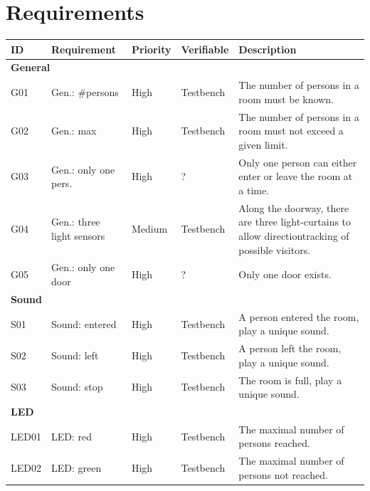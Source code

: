 \documentclass[12pt,a4 paper] {report}
\begin{document}
\newpage

\chapter{Requirements}
\begin{center}
	\begin{tabular}{|p{1.5cm}|p{3.5cm}|p{2cm}|p{2cm}|p{6cm}|}
		\hline
		\textbf{ID} & \textbf{Requirement} & \textbf{Priority} & \textbf{Verifiable} & \textbf{Description}\\
		\hline
		\multicolumn{5}{|l|}{\textbf{General}} \\
		\hline
		G01 & Gen.: \#persons &  High &  Testbench & The number of persons in a room must be known. \\
		\hline
		G02 & Gen.: max & High &  Testbench & The number of persons in a room must not exceed a given limit. \\
		\hline
		G03 & Gen.: only one pers. & High & ? & Only one person can either enter or leave the room at a time. \\
		\hline
		G04 & Gen.: three light sensors & Medium & Testbench & Along the doorway, there are three light-curtains to allow directiontracking of possible visitors. \\
		\hline
		G05 & Gen.: only one door & High & ? & Only one door exists. \\
		\hline
		\multicolumn{5}{|l|}{\textbf{Sound}} \\
		\hline
		S01 & Sound: entered & High & Testbench & A person entered the room, play a unique sound. \\
		\hline
		S02 & Sound: left & High & Testbench & A person left the room, play a unique sound. \\
		\hline
		S03 & Sound: stop & High & Testbench & The room is full, play a unique sound. \\
		\hline
		\multicolumn{5}{|l|}{\textbf{LED}} \\
		\hline
		LED01 & LED: red &  High & Testbench & The maximal number of persons reached. \\
		\hline
		LED02 & LED: green & High & Testbench & The maximal number of persons not reached. \\
		\hline
	\end{tabular}
\end{center}
\end{document}
